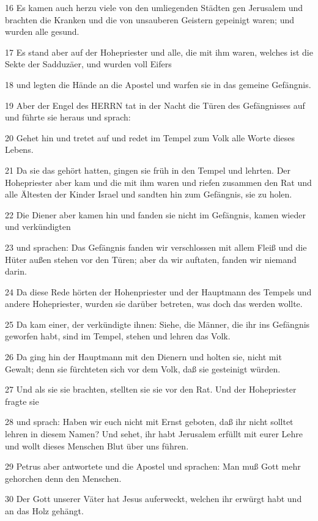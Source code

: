\par 16 Es kamen auch herzu viele von den umliegenden Städten gen Jerusalem und brachten die Kranken und die von unsauberen Geistern gepeinigt waren; und wurden alle gesund.
\par 17 Es stand aber auf der Hohepriester und alle, die mit ihm waren, welches ist die Sekte der Sadduzäer, und wurden voll Eifers
\par 18 und legten die Hände an die Apostel und warfen sie in das gemeine Gefängnis.
\par 19 Aber der Engel des HERRN tat in der Nacht die Türen des Gefängnisses auf und führte sie heraus und sprach:
\par 20 Gehet hin und tretet auf und redet im Tempel zum Volk alle Worte dieses Lebens.
\par 21 Da sie das gehört hatten, gingen sie früh in den Tempel und lehrten. Der Hohepriester aber kam und die mit ihm waren und riefen zusammen den Rat und alle Ältesten der Kinder Israel und sandten hin zum Gefängnis, sie zu holen.
\par 22 Die Diener aber kamen hin und fanden sie nicht im Gefängnis, kamen wieder und verkündigten
\par 23 und sprachen: Das Gefängnis fanden wir verschlossen mit allem Fleiß und die Hüter außen stehen vor den Türen; aber da wir auftaten, fanden wir niemand darin.
\par 24 Da diese Rede hörten der Hohenpriester und der Hauptmann des Tempels und andere Hohepriester, wurden sie darüber betreten, was doch das werden wollte.
\par 25 Da kam einer, der verkündigte ihnen: Siehe, die Männer, die ihr ins Gefängnis geworfen habt, sind im Tempel, stehen und lehren das Volk.
\par 26 Da ging hin der Hauptmann mit den Dienern und holten sie, nicht mit Gewalt; denn sie fürchteten sich vor dem Volk, daß sie gesteinigt würden.
\par 27 Und als sie sie brachten, stellten sie sie vor den Rat. Und der Hohepriester fragte sie
\par 28 und sprach: Haben wir euch nicht mit Ernst geboten, daß ihr nicht solltet lehren in diesem Namen? Und sehet, ihr habt Jerusalem erfüllt mit eurer Lehre und wollt dieses Menschen Blut über uns führen.
\par 29 Petrus aber antwortete und die Apostel und sprachen: Man muß Gott mehr gehorchen denn den Menschen.
\par 30 Der Gott unserer Väter hat Jesus auferweckt, welchen ihr erwürgt habt und an das Holz gehängt.

